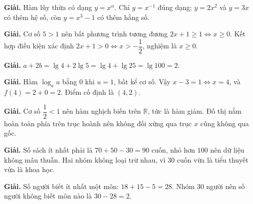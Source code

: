 \documentclass[11pt, a4paper]{article}
\begin{document}
\vspace{0.3cm}
\begin{dapan}[39 — Đáp án B]

\textbf{Giải.} Hàm lũy thừa có dạng $y=x^\alpha$. Chỉ $y=x^{-1}$ đúng dạng; $y=2x^2$ và $y=3x$ có thêm hệ số, còn $y=x^3-1$ có thêm hằng số.


\end{dapan}
\vspace{0.3cm}
\begin{dapan}[40 — Đáp án D]

\textbf{Giải.} Cơ số $5>1$ nên bất phương trình tương đương $2x+1\ge1 \iff x\ge0$. Kết hợp điều kiện xác định $2x+1>0 \iff x>-\dfrac{1}{2}$, nghiệm là $x\ge0$.


\end{dapan}
\vspace{0.3cm}
\begin{dapan}[41 — Đáp án C]

\textbf{Giải.} $a+2b=\lg4+2\lg5=\lg4+\lg25=\lg100=2$.


\end{dapan}
\vspace{0.3cm}
\begin{dapan}[42 — Đáp án D]

\textbf{Giải.} Hàm $\log_a u$ bằng $0$ khi $u=1$, bất kể cơ số. Vậy $x-3=1 \iff x=4$, và $f(4)=2+0=2$. Điểm cố định là $(4,2)$.


\end{dapan}
\vspace{0.3cm}
\begin{dapan}[43 — Đáp án D]

\textbf{Giải.} Cơ số $\dfrac{1}{2}<1$ nên hàm nghịch biến trên $\mathbb{R}$, tức là hàm giảm. Đồ thị nằm hoàn toàn phía trên trục hoành nên không đối xứng qua trục $x$ cũng không qua gốc.


\end{dapan}
\vspace{0.3cm}
\begin{dapan}[44 — Đáp án A]

\textbf{Giải.} Số sách ít nhất phải là $70+50-30=90$ cuốn, nhỏ hơn $100$ nên dữ liệu không mâu thuẫn. Hai nhóm không loại trừ nhau, vì $30$ cuốn vừa là tiểu thuyết vừa là khoa học.


\end{dapan}
\vspace{0.3cm}
\begin{dapan}[45 — Đáp án B]

\textbf{Giải.} Số người biết ít nhất một môn: $18+15-5=28$. Nhóm $30$ người nên số người không biết môn nào là $30-28=2$.


\end{dapan}
\end{document}
